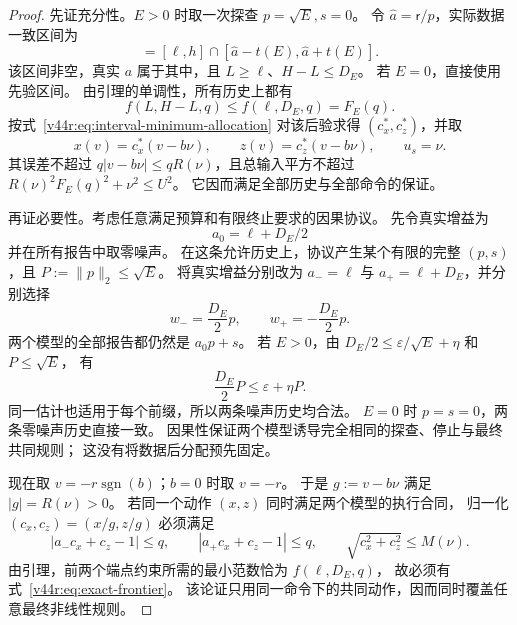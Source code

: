 \documentclass[11pt,a4paper]{article}
\numberwithin{equation}{section}
\theoremstyle{definition}
\begin{document}
\begin{proof}
先证充分性。$E>0$ 时取一次探查 $p=\sqrt E,s=0$。
令 $\widehat a=\mathsf r/p$，实际数据一致区间为
\begin{equation}
 [L,H]=[\ell,h]\cap[\widehat a-t(E),\widehat a+t(E)].
 \label{v44r:eq:posterior}
\end{equation}
该区间非空，真实 $a$ 属于其中，且 $L\ge\ell$、$H-L\le D_E$。
若 $E=0$，直接使用先验区间。
由引理的单调性，所有历史上都有
\[
 f(L,H-L,q)\le f(\ell,D_E,q)=F_E(q).
\]
按式~\eqref{v44r:eq:interval-minimum-allocation} 对该后验求得 $(c_x^*,c_z^*)$，并取
\begin{equation}
 x(v)=c_x^*(v-b\nu),\qquad
 z(v)=c_z^*(v-b\nu),\qquad u_s=\nu.
 \label{v44r:eq:attaining-policy}
\end{equation}
其误差不超过 $q|v-b\nu|\le qR(\nu)$，且总输入平方不超过
$R(\nu)^2F_E(q)^2+\nu^2\le U^2$。
它因而满足全部历史与全部命令的保证。

再证必要性。考虑任意满足预算和有限终止要求的因果协议。
先令真实增益为
\begin{equation}
 a_0=\ell+D_E/2
 \label{v44r:eq:common-midpoint}
\end{equation}
并在所有报告中取零噪声。
在这条允许历史上，协议产生某个有限的完整 $(p,s)$，且
$P:=\|p\|_2\le\sqrt E$。
将真实增益分别改为
$a_-=\ell$ 与 $a_+=\ell+D_E$，并分别选择
\begin{equation}
 w_-=\frac{D_E}{2}p,\qquad
 w_+=-\frac{D_E}{2}p.
 \label{v44r:eq:indistinguishable-pair-noise}
\end{equation}
两个模型的全部报告都仍然是 $a_0p+s$。
若 $E>0$，由 $D_E/2\le\varepsilon/\sqrt E+\eta$ 和 $P\le\sqrt E$，
有
\[
 \frac{D_E}{2}P\le\varepsilon+\eta P.
\]
同一估计也适用于每个前缀，所以两条噪声历史均合法。
$E=0$ 时 $p=s=0$，两条零噪声历史直接一致。
因果性保证两个模型诱导完全相同的探查、停止与最终共同规则；
这没有将数据后分配预先固定。

现在取 $v=-r\operatorname{sgn}(b)$；$b=0$ 时取 $v=-r$。
于是 $g:=v-b\nu$ 满足 $|g|=R(\nu)>0$。
若同一个动作 $(x,z)$ 同时满足两个模型的执行合同，
归一化 $(c_x,c_z)=(x/g,z/g)$ 必须满足
\[
 |a_-c_x+c_z-1|\le q,
 \qquad |a_+c_x+c_z-1|\le q,
 \qquad\sqrt{c_x^2+c_z^2}\le M(\nu).
\]
由引理，前两个端点约束所需的最小范数恰为 $f(\ell,D_E,q)$，
故必须有式~\eqref{v44r:eq:exact-frontier}。
该论证只用同一命令下的共同动作，因而同时覆盖任意最终非线性规则。
\end{proof}
\end{document}
